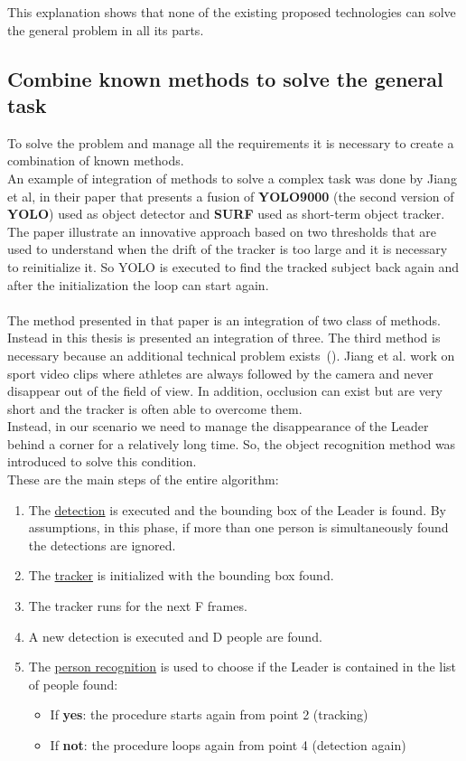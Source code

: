 This explanation shows that none of the existing proposed technologies can solve the general problem in all its parts.

\subsection{Combine known methods to solve the general task}
To solve the problem and manage all the requirements it is necessary to create a combination of known methods.\\
An example of integration of methods to solve a complex task was done by Jiang et al, in their paper\cite{multi-feature-fusion-and-YOLO} that presents a fusion of \textbf{YOLO9000}\cite{yoloV2} (the second version of \textbf{YOLO}\cite{yolo}) used as object detector and \textbf{SURF}\cite{surf} used as short-term object tracker.\\
The paper illustrate an innovative approach based on two thresholds that are used to understand when the drift of the tracker is too large and it is necessary to reinitialize it. So YOLO is executed to find the tracked subject back again and after the initialization the loop can start again.\\
\\
The method presented in that paper is an integration of two class of methods. Instead in this thesis is presented an integration of three. The third method is necessary because an additional technical problem exists~(). Jiang et al. work on sport video clips where athletes are always followed by the camera and never disappear out of the field of view. In addition, occlusion can exist but are very short and the tracker is often able to overcome them.\\
Instead, in our scenario we need  to manage the disappearance of the Leader behind a corner for a relatively long time. So, the object recognition method was introduced to solve this condition.\\ 
These are the main steps of the entire algorithm:
\begin{enumerate}
	\item The \underline{detection} is executed and the bounding box of the Leader is found. By assumptions, in this phase, if more than one person is simultaneously found the detections are ignored.
	\item The \underline{tracker} is initialized with the bounding box found.
	\item The tracker runs for the next F frames.
	\item A new detection is executed and D people are found.
	\item The \underline{person recognition} is used to choose if the Leader is contained in the list of people found:
	\begin{itemize}
		\item If \textbf{yes}: the procedure starts again from point 2 (tracking)
		\item If \textbf{not}: the procedure loops again from point 4 (detection again)
	\end{itemize}
\end{enumerate}

